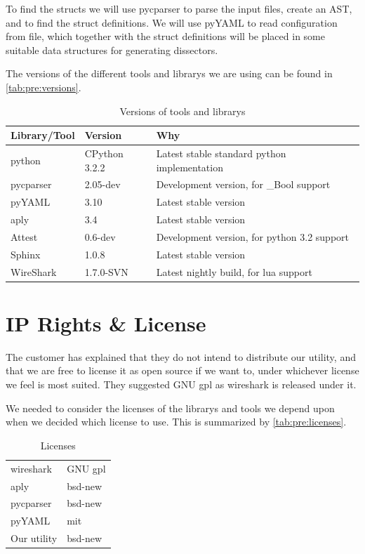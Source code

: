 To find the \glspl{struct} we will use \gls{pycparser} to parse the input files, create an
\gls{AST}, and to find the \gls{struct} definitions. We will use pyYAML to
read configuration from file, which together with the \gls{struct} definitions will
be placed in some suitable data structures for generating \glspl{dissector}.

The versions of the different tools and \glspl{library} we are using can be found in
\autoref{tab:pre:versions}.
\begin{table}[!h] \footnotesize \center
\vspace{-10pt}
\caption{Versions of tools and \glspl{library}\label{tab:pre:versions}}
\begin{tabular}{l l l}
	\toprule
	Library/Tool & Version & Why \\
	\midrule
	\Gls{python} & CPython 3.2.2 & Latest stable standard \Gls{python} implementation \\
	\gls{pycparser} & 2.05-dev & Development version, for \_Bool support \\
	pyYAML & 3.10 & Latest stable version \\
	\Gls{aply} & 3.4 & Latest stable version \\
	Attest & 0.6-dev & Development version, for \Gls{python} 3.2 support \\
	Sphinx & 1.0.8 & Latest stable version \\
	WireShark & 1.7.0-SVN & Latest nightly build, for \Gls{lua} support \\
	\bottomrule
\end{tabular}
\vspace{-10pt}
\end{table}


\section{IP Rights \& License}
\label{sec:pre:license}
The customer has explained that they do not intend to distribute our \gls{utility},
and that we are free to license it as open source if we want to, under
whichever license we feel is most suited. They suggested GNU \Gls{gpl} as \Gls{wireshark}
is released under it.

We needed to consider the licenses of the \glspl{library} and tools we depend upon
when we decided which license to use. This is summarized by
\autoref{tab:pre:licenses}.
\begin{table}[!h] \footnotesize \center
\vspace{-20pt}
\caption{Licenses\label{tab:pre:licenses}}
\begin{tabular}{l l}
	\toprule
	\Gls{wireshark} & GNU \Gls{gpl} \\
	\Gls{aply} & \Gls{bsd}-new \\
	\gls{pycparser} & \Gls{bsd}-new \\
	pyYAML & \Gls{mit} \\
	\midrule
	Our \gls{utility} & \Gls{bsd}-new \\
	\bottomrule
\end{tabular}
\vspace{-10pt}
\end{table}

